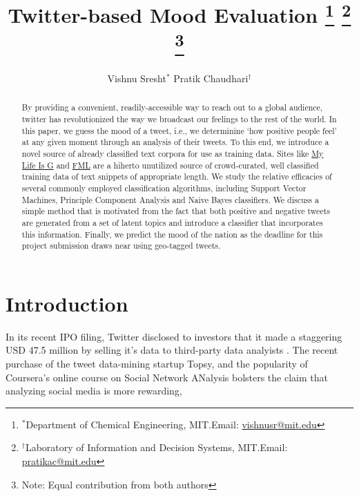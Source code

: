 \documentclass[11pt, letterpaper, conference, final, twocolumn]{ieeeconf}
\begin{document}
\title{\bf Twitter-based Mood Evaluation
	\thanks{$^*$Department of Chemical Engineering, MIT.\newline Email: \href{mailto:vishnusr@mit.edu}{vishnusr@mit.edu}}
	\thanks{$^\dag$Laboratory of Information and Decision Systems, MIT.\newline Email: \href{mailto:pratikac@mit.edu}{pratikac@mit.edu}}
	\thanks{Note: Equal contribution from both authors}
}
\author{Vishnu Sresht$^*$ \qquad Pratik Chaudhari$^\dag$}
\maketitle

\begin{abstract}
By providing a convenient, readily-accessible way to reach out to a global audience, twitter has revolutionized the way we broadcast our feelings to the rest of the world. In this paper, we guess the mood of a tweet, i.e., we determinine `how positive people feel' at any given moment through an analysis of their tweets. To this end, we introduce a novel source of already classified text corpora for use as training data. Sites like \href{http://mylifeisg.com}{My Life Is G} and \href{http://fmylife.com}{FML} are a hiherto unutilized source of crowd-curated, well classified training data of text snippets of appropriate length. We study the relative efficacies of several commonly employed classification algorithms, including Support Vector Machines, Principle Component Analysis and Naive Bayes classifiers. We discuss a simple method that is motivated from the fact that both positive and negative tweets are generated from a set of latent topics and introduce a classifier that incorporates this information. Finally, we predict the mood of the nation as the deadline for this project submission draws near using geo-tagged tweets.
\end{abstract}

\section{Introduction}
\label{sec:intro}
In its recent IPO filing, Twitter disclosed to investors that it made a staggering USD 47.5 million by selling it's data to third-party data analyists \cite{wsj_twitter}. The recent purchase of the tweet data-mining startup Topsy, and the popularity of Coursera's online course on Social Network ANalysis  bolsters the claim that analyzing social media is more rewarding, 
\end{document}
